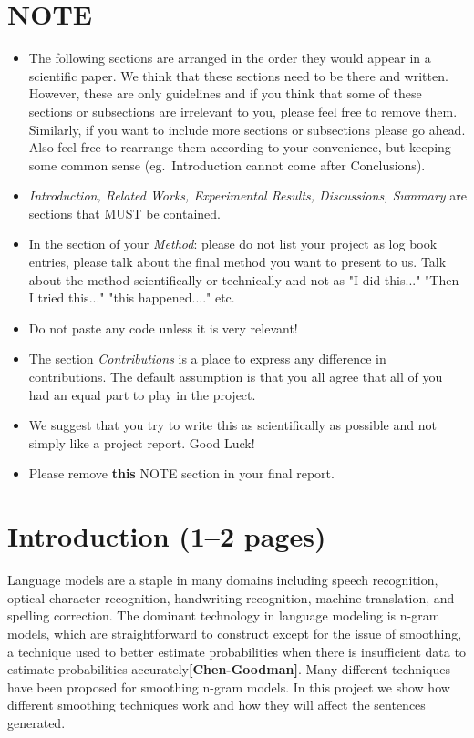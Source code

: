 \documentclass[a4paper,12pt]{article}
\begin{document}
\section*{NOTE}
\begin{itemize}

\item The following sections are arranged in the order they would appear in a scientific paper. We think that these sections need to be there and written. However, these are only guidelines and if you think that some of these sections or subsections are irrelevant to you, please feel free to remove them. Similarly, if you want to include more sections or subsections please go ahead. Also feel free to rearrange them according to your convenience, but keeping some common sense (eg.~Introduction cannot come after Conclusions).

\item \textit{Introduction, Related Works, Experimental Results, Discussions, Summary} are sections that MUST be contained.

\item In the section of your \textit{Method}: please do not list your project as log book entries, please talk about the final method you want to present to us. Talk about the method scientifically or technically and not as "I did this..." "Then I tried this..." "this happened...." etc.

\item Do not paste any code unless it is very relevant!

\item The section \textit{Contributions} is a place to express any difference in contributions. The default assumption is that you all agree that all of you had an equal part to play in the project.

\item We suggest that you try to write this as scientifically as possible and not simply like a project report. Good Luck!

\item Please remove \textbf{this} NOTE section in your final report.

\end{itemize}
\section{Introduction (1--2 pages)}
\label{sec:intro}

Language models are a staple in many domains including speech recognition, optical character
recognition, handwriting recognition, machine translation, and spelling correction. The dominant technology in language modeling is n-gram models, which are straightforward to construct except for the issue of smoothing, a technique used to better estimate probabilities when there is insufficient data to estimate probabilities accurately\textbf{[Chen-Goodman]}. Many different techniques have been proposed for smoothing n-gram models. In this project we show how different smoothing techniques work and how they will affect the sentences generated.
\end{document}
